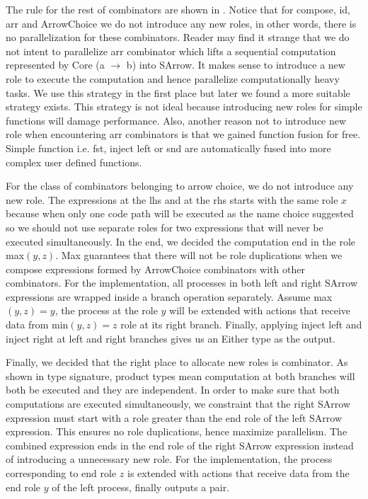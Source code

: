 The rule for the rest of combinators are shown in . Notice that for compose, id, arr and ArrowChoice we do not introduce any new roles, in other words, there is no parallelization for these combinators. Reader may find it strange that we do not intent to parallelize arr combinator which lifts a sequential computation represented by Core (a $\rightarrow$ b) into SArrow. It makes sense to introduce a new role to execute the computation and hence parallelize computationally heavy tasks. We use this strategy in the first place but later we found a more suitable strategy exists. This strategy is not ideal because introducing new roles for simple functions will damage performance. Also, another reason not to introduce new role when encountering arr combinators is that we gained function fusion for free. Simple function i.e. fst, inject left or snd are automatically fused into more complex user defined functions.  %

For the class of combinators belonging to arrow choice, we do not introduce any new role. The expressions at the lhs and at the rhs starts with the same role $x$ because when only one code path will be executed as the name choice suggested so we should not use separate roles for two expressions that will never be executed simultaneously. In the end, we decided the computation end in the role max$(y,z)$. Max guarantees that there will not be role duplications when we compose expressions formed by ArrowChoice combinators with other combinators. For the implementation, all processes in both left and right SArrow expressions are wrapped inside a branch operation separately. Assume max$(y, z) = y$, the process at the role $y$ will be extended with actions that receive data from min$(y, z) = z$ role at its right branch. Finally, applying inject left and inject right at left and right branches gives us an Either type as the output.

Finally, we decided that the right place to allocate new roles is \hask{&&&} combinator. As shown in type signature, product types mean computation at both branches will both be executed and they are independent. In order to make sure that both computations are executed simultaneously, we constraint that the right SArrow expression must start with a role greater than the end role of the left SArrow expression. This ensures no role duplications, hence maximize parallelism. The combined expression ends in the end role of the right SArrow expression instead of introducing a unnecessary new role. For the implementation, the process corresponding to end role $z$ is extended with actions that receive data from the end role $y$ of the left process, finally outputs a pair.

